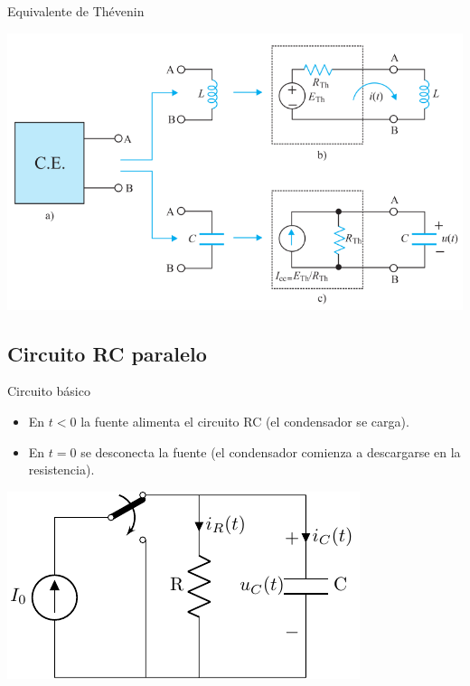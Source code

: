 \documentclass[xcolor={usenames,svgnames,dvipsnames}]{beamer}
\begin{document}
\begin{frame}[label={sec:org221383e}]{Equivalente de Thévenin}
\begin{center}
\includegraphics[width=.9\linewidth]{figs/Thevenin_PrimerOrden.pdf}
\end{center}
\end{frame}
\subsection{Circuito RC paralelo}
\label{sec:org0daddf6}

\begin{frame}[label={sec:orgdf444ec}]{Circuito básico}
\begin{itemize}
\item En \(t <0\) la fuente alimenta el circuito RC (el condensador se carga).
\item En \(t = 0\) se desconecta la fuente (el condensador comienza a descargarse en la resistencia).
\end{itemize}
\begin{center}
\includegraphics[width=.9\linewidth]{figs/transitorio_circuitoRC.pdf}
\end{center}
\end{frame}
\end{document}
